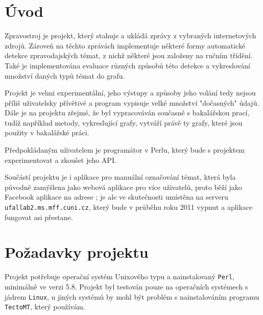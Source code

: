\documentclass[12pt,a4paper]{report}
\begin{document}
    

\tableofcontents


\chapter{Úvod}
Zpravostroj je projekt, který stahuje a ukládá zprávy z vybraných internetových zdrojů. Zároveň na těchto zprávách implementuje některé formy automatické detekce zpravodajských témat, z nichž některé jsou založeny na ručním třídění. Také je implementována evaluace různých způsobů této detekce a vykreslování množství daných typů témat do grafu.

Projekt je velmi experimentální, jeho výstupy a způsoby jeho volání tedy nejsou příliš uživatelsky přívětivé a program vypisuje velké množství "dočasných" údajů. Dále je na projektu zřejmé, že byl vypracováván současně s bakalářskou prací, tudíž například metody, vykreslující grafy, vytváří právě ty grafy, které jsou použity v bakalářské práci.

Předpokládaným uživatelem je programátor v Perlu, který bude s projektem experimentovat a zkoušet jeho API.


Součástí projektu je i aplikace pro manuální označování témat, která byla původně zamýšlena jako webová aplikace pro více uživatelů, proto běží jako Facebook aplikace na adrese ; je ale ve skutečnosti umístěna na serveru \texttt{ufallab2.ms.mff.cuni.cz}, který bude v průběhu roku 2011 vypnut a aplikace fungovat asi přestane.

\chapter{Požadavky projektu}

Projekt potřebuje operační systém Unixového typu a nainstalovaný \texttt{Perl}, minimálně ve verzi 5.8. Projekt byl testován pouze na operačních systémech s jádrem \texttt{Linux}, u jiných systémů by mohl být problém s nainstalováním programu \texttt{TectoMT}, který používám.
\end{document}
